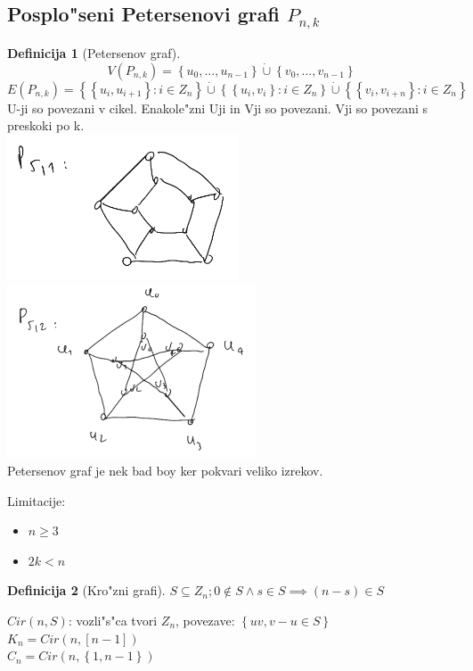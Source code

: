 \documentclass{article}
\theoremstyle{definition}
\newtheorem{definition}{Definicija}[section]
\begin{document}
	\subsection{Posplo"seni Petersenovi grafi $P_{n,k}$} 
	\begin{definition}[Petersenov graf]
		$$V(P_{n,k}) = \left\lbrace u_0, \ldots, u_{n-1} \right\rbrace \dot\cup \left\lbrace v_0, \ldots, v_{n-1} \right\rbrace $$  %
		$$E(P_{n,k}) = \left\lbrace\left\lbrace u_i,u_{i+1}\right\rbrace: i \in Z_n\right\rbrace \dot\cup \left\lbrace \left\lbrace u_i,v_i \right\rbrace: i \in Z_n \right\rbrace \dot\cup \left\lbrace\left\lbrace v_i,v_{i+n} \right\rbrace: i \in Z_n\right\rbrace$$ 
		U-ji so povezani v cikel. Enakole"zni Uji in Vji so povezani. Vji so povezani s preskoki po k.
		\\
		\includegraphics{petersenovi51}
		\includegraphics{petersenovi52}
		\\
		Petersenov graf je nek bad boy ker pokvari veliko izrekov.
	\end{definition}

	Limitacije:
	\begin{itemize}
		\item $n \geq 3$
		\item $2k < n$ 
	\end{itemize}

	
	
	\begin{definition}[Kro"zni grafi] 
		$S \subseteq Z_n; 0 \notin S \land s \in S \implies (n-s) \in S$
	\end{definition}
	$Cir(n, S)$: vozli"s"ca tvori $Z_n$, povezave: $\left\lbrace uv, v-u \in S\right\rbrace$ \\ 
	$K_n = Cir(n, [n-1])$ \\ 
	$C_n = Cir(n, \left\lbrace1, n-1\right\rbrace)$
	
\end{document}
